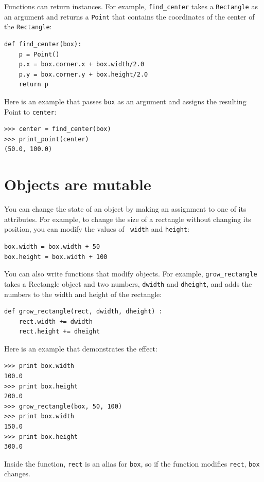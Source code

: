 \documentclass[10pt]{book}
\begin{document}
{

Functions can return instances.  For example, \verb"find_center"
takes a {\tt Rectangle} as an argument and returns a {\tt Point}
that contains the coordinates of the center of the {\tt Rectangle}:

\beforeverb
\begin{verbatim}
def find_center(box):
    p = Point()
    p.x = box.corner.x + box.width/2.0
    p.y = box.corner.y + box.height/2.0
    return p
\end{verbatim}
\afterverb
%
Here is an example that passes {\tt box} as an argument and assigns
the resulting Point to {\tt center}:

\beforeverb
\begin{verbatim}
>>> center = find_center(box)
>>> print_point(center)
(50.0, 100.0)
\end{verbatim}
\afterverb
%

\section{Objects are mutable}


You can change the state of an object by making an assignment to one of
its attributes.  For example, to change the size of a rectangle
without changing its position, you can modify the values of {\tt
width} and {\tt height}:

\beforeverb
\begin{verbatim}
box.width = box.width + 50
box.height = box.width + 100
\end{verbatim}
\afterverb
%
You can also write functions that modify objects.  For example,
\verb"grow_rectangle" takes a Rectangle object and two numbers,
{\tt dwidth} and {\tt dheight}, and adds the numbers to the
width and height of the rectangle:

\beforeverb
\begin{verbatim}
def grow_rectangle(rect, dwidth, dheight) :
    rect.width += dwidth
    rect.height += dheight
\end{verbatim}
\afterverb
%
Here is an example that demonstrates the effect:

\beforeverb
\begin{verbatim}
>>> print box.width
100.0
>>> print box.height
200.0
>>> grow_rectangle(box, 50, 100)
>>> print box.width
150.0
>>> print box.height
300.0
\end{verbatim}
\afterverb
%
Inside the function, {\tt rect} is an
alias for {\tt box}, so if the function modifies {\tt rect}, 
{\tt box} changes.

}
\end{document}
